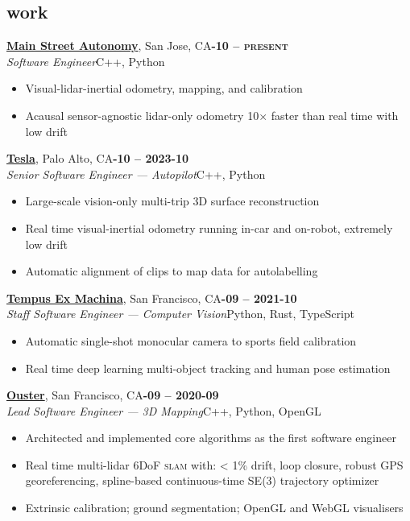 \documentclass[margin,10pt]{res}
\begin{document}
\begin{resume}
\section{\sc \lsstyle work}
    \href{https://mainstreetautonomy.com}{\textbf{Main Street Autonomy}}, San Jose, CA\hfill \textsc{\bfseries{}-10 -- present}\\
    \textit{Software Engineer}\hfill C++, Python
    \vspace{0.5em}
    \begin{itemize}
        \item Visual-lidar-inertial odometry, mapping, and calibration
        \item Acausal sensor-agnostic lidar-only odometry 10$\times$ faster than real time with low drift
    \end{itemize}
    
    \href{https://tesla.com/ai}{\textbf{Tesla}}, Palo Alto, CA\hfill \textsc{\bfseries{}-10 -- 2023-10}\\
    \textit{Senior Software Engineer --- Autopilot}\hfill C++, Python
    \vspace{0.5em}
    \begin{itemize}
        \item Large-scale vision-only multi-trip 3D surface reconstruction
        \item Real time visual-inertial odometry running in-car and on-robot, extremely low drift
        \item Automatic alignment of clips to map data for autolabelling
    \end{itemize}

    \href{https://tempus-ex.com}{\textbf{Tempus Ex Machina}}, San Francisco, CA\hfill \textsc{\bfseries{}-09 -- 2021-10}\\
    \textit{Staff Software Engineer --- Computer Vision}\hfill Python, Rust, TypeScript
    \vspace{0.5em}
    \begin{itemize}
        \item Automatic single-shot monocular camera to sports field calibration
        \item Real time deep learning multi-object tracking and human pose estimation
    \end{itemize}

    \href{https://ouster.com}{\textbf{Ouster}}, San Francisco, CA\hfill \textsc{\bfseries{}-09 -- 2020-09}\\
    \textit{Lead Software Engineer --- 3D Mapping}\hfill C++, Python, OpenGL
    \vspace{0.5em}
    \begin{itemize}
        \item Architected and implemented core algorithms as the first software engineer
        \item Real time multi-lidar 6DoF \textsc{slam} with: < 1\% drift, loop closure, robust GPS georeferencing, spline-based continuous-time SE(3) trajectory optimizer
        \item Extrinsic calibration; ground segmentation; OpenGL and WebGL visualisers
    \end{itemize}

\end{resume}
\end{document}
